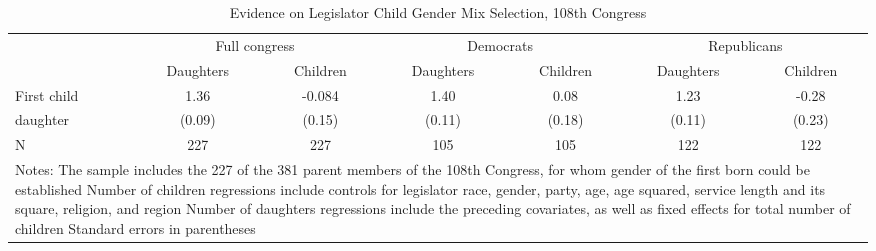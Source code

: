 \documentclass{article}
\begin{document}
\setcounter{table}{0}
\begin{table}
\caption{Evidence on Legislator Child Gender Mix Selection, 108th Congress  }
\begin{center}
\begin{tabular}{l c c c c c c } 
\hline
\hline
  & \multicolumn{2}{c}{ Full congress}  & \multicolumn{2}{c}{ Democrats} & \multicolumn{2}{c}{ Republicans}\\
  
  & Daughters & Children & Daughters & Children & Daughters & Children \\
  
\hline

First child & 1.36 & -0.084 & 1.40 & 0.08 & 1.23 & -0.28 \\

daughter & (0.09) & (0.15) & (0.11) & (0.18) & (0.11) & (0.23) \\

N & 227 & 227 & 105 & 105 & 122 & 122 \\

\hline

\multicolumn{7}{m{13cm}}{Notes: The sample includes the 227 of the 381 parent members of the 108th Congress, for whom gender of the first born could be established Number of children regressions include controls for legislator race, gender, party, age, age squared, service length and its square, religion, and region Number of daughters regressions include the preceding covariates, as well as fixed effects for total number of children Standard errors in parentheses  }

\end{tabular}
\label{table:coefficients}
\end{center}
\end{table}
\end{document}
